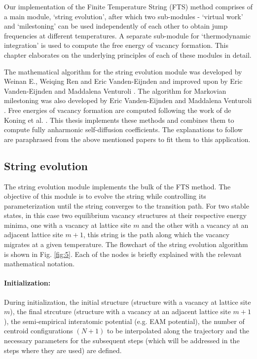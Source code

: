 \documentclass{article}
\begin{document}
Our implementation of the Finite Temperature String (FTS) method comprises of a main module, \enquote*{string evolution}, after which two sub-modules - \enquote*{virtual work} and \enquote*{milestoning} can be used independently of each other to obtain jump frequencies at different temperatures. A separate sub-module for \enquote*{thermodynamic integration} is used to compute the free energy of vacancy formation. This chapter elaborates on the underlying principles of each of these modules in detail.

The mathematical algorithm for the string evolution module was developed by Weinan E., Weiqing Ren and Eric Vanden-Eijnden \cite{Weinan2005} and improved upon by Eric Vanden-Eijnden and Maddalena Venturoli \cite{Vanden-Eijnden2009}. The algorithm for Markovian milestoning was also developed by Eric Vanden-Eijnden and Maddalena Venturoli \cite{Vanden-Eijnden2009a}. Free energies of vacancy formation are computed following the work of de Koning et al. \cite{deKoning}. This thesis implements these methods and combines them to compute fully anharmonic self-diffusion coefficients. The explanations to follow are paraphrased from the above mentioned papers to fit them to this application.

\subsection{String evolution} \label{string_evo}
\label{sec:3.1}

The string evolution module implements the bulk of the FTS method. The objective of this module is to evolve the string while controlling its parameterization until the string converges to the transition path. For two stable states, in this case two equilibrium vacancy structures at their respective energy minima, one with a vacancy at lattice site $m$ and the other with a vacancy at an adjacent lattice site $m+1$, this string is the path along which the vacancy migrates at a given temperature. The flowchart of the string evolution algorithm is shown in Fig. \ref{fig:5}. Each of the nodes is briefly explained with the relevant mathematical notation.

\paragraph*{Initialization:}

During initialization, the initial structure (structure with a vacancy at lattice site $m$), the final strcuture (structure with a vacancy at an adjacent lattice site $m+1$), the semi-empirical interatomic potential (e.g. EAM potential), the number of centroid configurations $(N + 1)$ to be interpolated along the trajectory and the necessary parameters for the subsequent steps (which will be addressed in the steps where they are used) are defined. 
\end{document}
